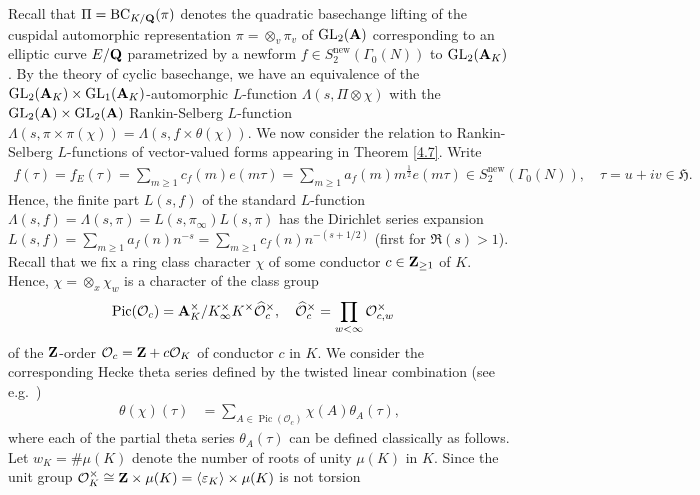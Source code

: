 \documentclass{amsart}
\theoremstyle{definition}
\begin{document}
Recall that $\Pi = \operatorname{BC}_{K/{\bf{Q}}}(\pi)$ denotes the quadratic basechange lifting of the cuspidal automorphic representation $\pi = \otimes_v \pi_v$ of 
$\operatorname{GL}_2({\bf{A}})$ corresponding to an elliptic curve $E/{\bf{Q}}$ parametrized by a newform 
$f \in S_2^{\operatorname{new}}(\Gamma_0(N))$ to $\operatorname{GL}_2({\bf{A}}_K)$. 
By the theory of cyclic basechange, we have an equivalence of the $\operatorname{GL}_2({\bf{A}}_K) \times \operatorname{GL}_1({\bf{A}}_K)$-automorphic
$L$-function $\Lambda(s, \Pi \otimes \chi)$ with the $\operatorname{GL}_2({\bf{A}}) \times \operatorname{GL}_2({\bf{A}})$ Rankin-Selberg $L$-function
$\Lambda(s, \pi \times \pi(\chi)) = \Lambda(s, f \times \theta(\chi))$. 
We now consider the relation to Rankin-Selberg $L$-functions of vector-valued forms appearing in Theorem \ref{4.7}. Write
\begin{align*} f(\tau)  = f_E(\tau) = \sum\limits_{m \geq 1} c_f(m) e(m \tau) = \sum\limits_{m \geq 1} a_f(m) m^{\frac{1}{2}} e(m \tau)
\in S_2^{\operatorname{new}}(\Gamma_0(N)), \quad \tau = u + iv \in \mathfrak{H}. \end{align*}
Hence, the finite part $L(s, f)$ of the standard $L$-function $\Lambda(s, f) = \Lambda(s, \pi) = L(s, \pi_{\infty}) L(s, \pi)$
has the Dirichlet series expansion $L(s, f) = \sum_{m \geq 1} a_f(n) n^{-s} = \sum_{m \geq 1} c_f(n) n^{-(s + 1/2)}$ (first for $\Re(s)>1$). 
Recall that we fix a ring class character $\chi$ of some conductor $c \in {\bf{Z}}_{\geq 1}$ of $K$. 
Hence, $\chi = \otimes_x \chi_w$ is a character of the class group 
\begin{align*} \operatorname{Pic}(\mathcal{O}_c) 
&= {\bf{A}}_K^{\times}/  K_{\infty}^{\times} K^{\times} \widehat{\mathcal{O}}_c^{\times}, 
\quad \widehat{\mathcal{O}}_c^{\times} = \prod_{w < \infty} \mathcal{O}_{c, w}^{\times} \end{align*} 
of the ${\bf{Z}}$-order $\mathcal{O}_c = {\bf{Z}} + c \mathcal{O}_K$ of conductor $c$ in $K$. 
We consider the corresponding Hecke theta series defined by the twisted linear combination (see e.g.~\cite[(5.4)]{GZ})
\begin{align}\label{Hecketheta} \theta(\chi)(\tau) &= \sum\limits_{A \in \operatorname{Pic}(\mathcal{O}_c)} \chi(A) \theta_{A}(\tau),\end{align}
where each of the partial theta series $\theta_A(\tau)$ can be defined classically as follows. 
Let $w_K = \# \mu(K)$ denote the number of roots of unity $\mu(K)$ in $K$. 
Since the unit group $\mathcal{O}_K^{\times} \cong {\bf{Z}} \times \mu(K) = \langle \varepsilon_K \rangle \times \mu(K)$ is not torsion
\end{document}

